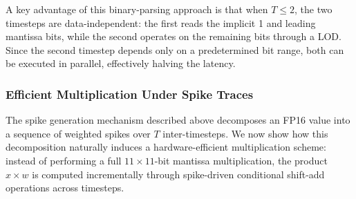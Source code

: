 
A key advantage of this binary-parsing approach is that when $T \leq 2$, the two timesteps are data-independent: the first reads the implicit 1 and leading mantissa bits, while the second operates on the remaining bits through a LOD. Since the second timestep depends only on a predetermined bit range, both can be executed in parallel, effectively halving the latency.

\subsubsection{Efficient Multiplication Under Spike Traces}
The spike generation mechanism described above decomposes an FP16 value into a sequence of weighted spikes over $T$ inter-timesteps. We now show how this decomposition naturally induces a hardware-efficient multiplication scheme: instead of performing a full $11 \times 11$-bit mantissa multiplication, the product $x \times w$ is computed incrementally through spike-driven conditional shift-add operations across timesteps.

